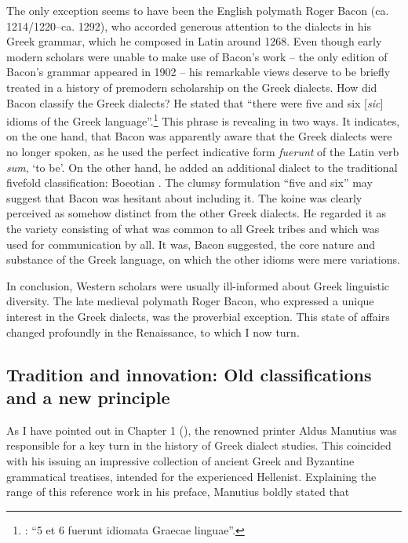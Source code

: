 The only exception seems to have been the English polymath Roger Bacon (ca. 1214/1220–ca. 1292), who accorded generous attention to the dialects in his Greek grammar, which he composed in Latin around 1268. Even though early modern scholars were unable to make use of Bacon’s work – the only edition of Bacon’s grammar appeared in 1902 – his remarkable views deserve to be briefly treated in a history of premodern scholarship on the Greek dialects. How did Bacon classify the Greek dialects? He stated that “there were five and six [\textit{sic}] idioms of the Greek language”.\footnote{\citet[26]{Bacon1902}: “5 et 6 fuerunt idiomata Graecae linguae”.} This phrase is revealing in two ways. It indicates, on the one hand, that Bacon was apparently aware that the Greek dialects were no longer spoken, as he used the perfect indicative form \textit{fuerunt} of the Latin verb \textit{sum}, ‘to be’. On the other hand, he added an additional dialect to the traditional fivefold classification: Boeotian \citep[27]{Bacon1902}. The clumsy formulation “five and six” may suggest that Bacon was hesitant about including it. The koine was clearly perceived as somehow distinct from the other Greek dialects. He regarded it as the variety consisting of what was common to all Greek tribes and which was used for communication by all. It was, Bacon suggested, the core nature and substance of the Greek language, on which the other idioms were mere variations.

In conclusion, Western scholars were usually ill-informed about Greek linguistic diversity. The late medieval polymath Roger Bacon, who expressed a unique interest in the Greek dialects, was the proverbial exception. This state of affairs changed profoundly in the Renaissance, to which I now turn.

\subsection{Tradition and innovation: Old classifications and a new principle}
\hypertarget{Toc19704812}{}
As I have pointed out in Chapter 1 (), the renowned printer Aldus Manutius was responsible for a key turn in the history of Greek dialect studies. This coincided with his issuing an impressive collection of ancient Greek and Byzantine grammatical treatises, intended for the experienced Hellenist. Explaining the range of this reference work in his preface, Manutius boldly stated that

